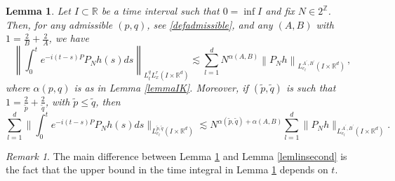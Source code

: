 \documentclass[aihp]{imsart}
\numberwithin{equation}{section}
\theoremstyle{plain}
\newtheorem{lem}[thm]{Lemma}
\theoremstyle{remark}
\newtheorem{rmq}[thm]{Remark}
\newcommand{\R}{\mathbb{R}}
\newcommand{\Z}{\mathbb{Z}}
\begin{document}
\begin{lem}
\label{lemlin}
 Let $I\subset \R$ be a time interval such that $0=\inf I$ and fix $N\in 2^\Z$. Then, for any admissible $(p,q)$, see \eqref{defadmissible}, and any $(A, B)$ with $1= \frac{2}{B} +\frac{2}{A}$, we have
$$\left\|\int_0^t e^{-i(t-s) P} P_N h(s) ds\right\|_{L_t^q L_x^r (I\times \R^d )} \lesssim  \sum_{l=1}^d N^{\alpha (A,B)} \left\|P_N h\right\|_{L_{e_l}^{A^\prime ,B^\prime} (I\times \R^d )} \,,$$
where $\alpha(p, q)$ is as in Lemma \ref{lemmaIK}.
Moreover, if $(\tilde{p},\tilde{q}) $ is such that $1= \frac{2}{\tilde{p}} +\frac{2}{\tilde{q}}$, with $\tilde{p} \leq \tilde{q}$, then
$$ \sum_{l=1}^d\Big\|\int_0^t e^{-i(t-s) P} P_N h(s) ds \Big\|_{L_{e_l}^{\tilde{p},\tilde{q}} (I\times \R^d)}\lesssim 
N^{\alpha(\tilde{p},\tilde{q}) + \alpha (A,B)} \sum_{l=1}^d  \|P_N h\|_{L_{e_l}^{A^\prime ,B^\prime} (I\times \R^d )}. $$
\end{lem}
\begin{rmq}

\textnormal{
The main difference between 
 Lemma \ref{lemlin} and Lemma \ref{lemlinsecond} is the fact that the upper bound in the time integral in Lemma \ref{lemlin}   depends on $t$.
}
\end{rmq}
\end{document}
